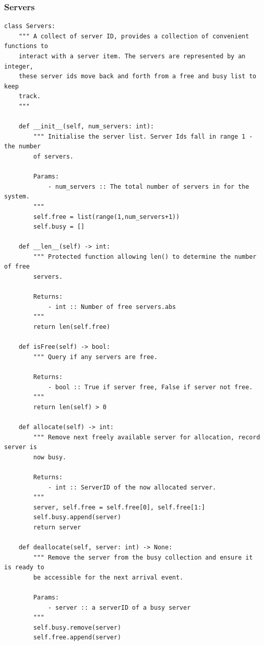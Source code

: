 \documentclass{ecmm427_assignment}
\begin{document}
\subsubsection{Servers}
\begin{verbatim}
class Servers:
    """ A collect of server ID, provides a collection of convenient functions to 
    interact with a server item. The servers are represented by an integer, 
    these server ids move back and forth from a free and busy list to keep
    track.
    """

    def __init__(self, num_servers: int):
        """ Initialise the server list. Server Ids fall in range 1 - the number
        of servers.
        
        Params:
            - num_servers :: The total number of servers in for the system.
        """
        self.free = list(range(1,num_servers+1))
        self.busy = []

    def __len__(self) -> int:
        """ Protected function allowing len() to determine the number of free
        servers.

        Returns:
            - int :: Number of free servers.abs
        """
        return len(self.free)

    def isFree(self) -> bool:
        """ Query if any servers are free.

        Returns:
            - bool :: True if server free, False if server not free.
        """
        return len(self) > 0

    def allocate(self) -> int:
        """ Remove next freely available server for allocation, record server is
        now busy.

        Returns:
            - int :: ServerID of the now allocated server.
        """
        server, self.free = self.free[0], self.free[1:]
        self.busy.append(server)
        return server

    def deallocate(self, server: int) -> None:
        """ Remove the server from the busy collection and ensure it is ready to
        be accessible for the next arrival event.

        Params:
            - server :: a serverID of a busy server
        """
        self.busy.remove(server)
        self.free.append(server)
\end{verbatim}
\end{document}
